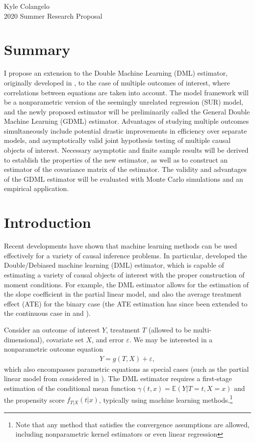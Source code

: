 \documentclass[12pt]{article}
\begin{document}
	\begin{center}
	Kyle Colangelo\\
	2020 Summer Research Proposal
	\end{center}
\section{Summary}
I propose an extension to the Double Machine Learning (DML) estimator, originally developed in  \cite{chernozhukov2018double}, to the case of multiple outcomes of interest, where correlations between equations are taken into account. The model framework will be a nonparametric version of the seemingly unrelated regression (SUR) model, and the newly proposed estimator will be preliminarily called the General Double Machine Learning (GDML) estimator. Advantages of studying multiple outcomes simultaneously include potential drastic improvements in efficiency over separate models, and asymptotically valid joint hypothesis testing of multiple causal objects of interest. Necessary asymptotic and finite sample results will be derived to establish the properties of the new estimator, as well as to construct an estimator of the covariance matrix of the estimator. The validity and advantages of the GDML estimator will be evaluated with Monte Carlo simulations and an empirical application.
\section{Introduction}
Recent developments have shown that machine learning methods can be used effectively for a variety of causal inference problems. In particular, \cite{chernozhukov2018double} developed the Double/Debiased machine learning (DML) estimator, which is capable of estimating a variety of causal objects of interest with the proper construction of moment conditions. For example, the DML estimator allows for the estimation of the slope coefficient in the partial linear model, and also the average treatment effect (ATE) for the binary case (the ATE estimation has since been extended to the continuous case in \cite{su2019non} and \cite{colangelo2020double}).

Consider an outcome of interest $Y$, treatment $T$ (allowed to be multi-dimensional), covariate set $X$, and error $\varepsilon$. We may be interested in a nonparametric outcome equation
\begin{align}
	Y = g(T,X) + \varepsilon\label{eq:1},
\end{align}
which also encompasses parametric equations as special cases (such as the partial linear model from \cite{robinson1988root} considered in \cite{chernozhukov2018double}). The DML estimator requires a first-stage estimation of the conditional mean function $\gamma(t,x) = \mathbb{E}(Y|T=t,X=x)$ and the propensity score $f_{T|X}(t|x)$, typically using machine learning methods.\footnote{Note that any method that satisfies the convergence assumptions are allowed, including nonparametric kernel estimators or even linear regression}
\end{document}
